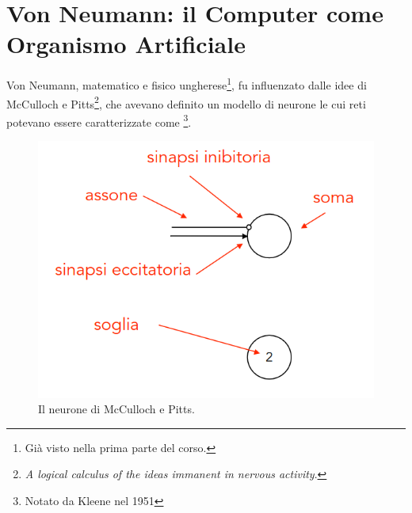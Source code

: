 
\section{Von Neumann: il Computer come Organismo Artificiale}

Von Neumann, matematico e fisico ungherese\footnote{Già visto
nella prima parte del corso.}, fu influenzato dalle idee di
McCulloch e Pitts\footnote{
    \textit{A logical calculus of the ideas immanent in nervous activity}.
}, che avevano definito un modello di neurone
le cui reti potevano essere caratterizzate come \footnote{Notato da Kleene nel 1951}.

\begin{figure}[h]
    \centering
    \includegraphics[scale = 0.25]{images/McCulloch-Pitts.png}
    \caption{Il neurone di McCulloch e Pitts.}
\end{figure}

